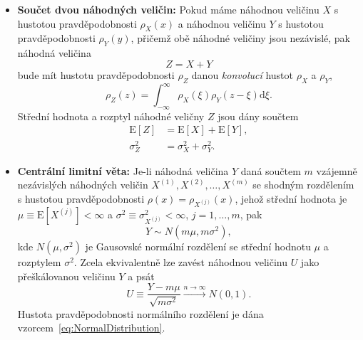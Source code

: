 \documentclass[a4paper,11pt,twoside]{article}
\renewcommand{\d}{\mathrm{d}}
\def\expectation#1{\mathrm{E}\left[#1\right]}
\def\dispersion#1{\sigma_{#1}^{2}}
\theoremstyle{red}
\theoremstyle{green}
\begin{document}
\begin{itemize}
            \item {\bf Součet dvou náhodných veličin:} 
                Pokud máme náhodnou veličinu $X$ s hustotou pravděpodobnosti $\rho_{X}(x)$ a náhodnou veličinu $Y$ s hustotou pravděpodobnosti $\rho_{Y}(y)$, přičemž obě náhodné veličiny jsou nezávislé, pak náhodná veličina
                \begin{equation}
                    Z=X+Y
                \end{equation}
                bude mít hustotu pravděpodobnosti $\rho_{Z}$ danou \emph{konvolucí} hustot $\rho_{X}$ a $\rho_{Y}$,
                \begin{equation}
                    \label{eq:SumDensity}
                    \rho_{Z}(z)=\int_{-\infty}^{\infty}\rho_{X}(\xi)\rho_{Y}(z-\xi)\d\xi.
                \end{equation}
                Střední hodnota a rozptyl náhodné veličny $Z$ jsou dány součtem 
                \begin{align}
                    \expectation{Z}&=\expectation{X}+\expectation{Y},\nonumber\\
                    \dispersion{Z}&=\dispersion{X}+\dispersion{Y}.
                \end{align}

            \item {\bf Centrální limitní věta:}
                Je-li náhodná veličina $Y$ daná součtem $m$ vzájemně nezávislých náhodných veličin $X^{(1)},X^{(2)},\dotsc,X^{(m)}$ se shodným rozdělením s hustotou pravděpodobnosti $\rho(x)=\rho_{X^{(j)}}(x)$, jehož střední hodnota je $\mu\equiv\expectation{X^{(j)}}<\infty$ a $\sigma^{2}\equiv\dispersion{X^{(j)}}<\infty$, $j=1,\dotsc,m$,
                pak 
                \begin{equation}
                    \label{eq:CLT}
                    Y\sim N(m\mu,m\sigma^{2}),
                \end{equation}
                kde $N(\mu,\sigma^{2})$ je Gausovské normální rozdělení se střední hodnotu $\mu$ a rozptylem $\sigma^{2}$.
                Zcela ekvivalentně lze zavést náhodnou veličinu $U$ jako přeškálovanou veličinu $Y$ a psát
                \begin{equation}
                    \label{eq:CLT1}
                    U\equiv\frac{Y-m\mu}{\sqrt{m\sigma^{2}}}\xrightarrow{n\rightarrow\infty}N(0,1).
                \end{equation}
                Hustota pravděpodobnosti normálního rozdělení je dána vzorcem~\eqref{eq:NormalDistribution}.
        \end{itemize}
\end{document}
